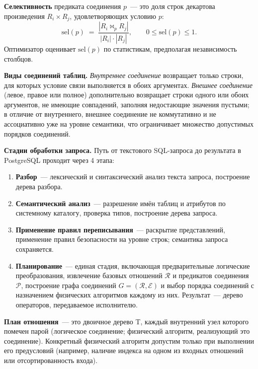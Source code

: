 \textbf{Селективность} предиката соединения $p$~--- это доля строк декартова
произведения $R_i \times R_j$, удовлетворяющих условию $p$:
\[
    \mathrm{sel}(p) \;=\; \frac{|R_i \Join_p R_j|}{|R_i| \cdot |R_j|}, \qquad 0 \leqslant \mathrm{sel}(p) \leqslant 1.
\]
Оптимизатор оценивает $\mathrm{sel}(p)$ по статистикам, предполагая независимость столбцов.


\textbf{Виды соединений таблиц.}
\emph{Внутреннее соединение} возвращает только строки, для которых
условие связи выполняется в обоих аргументах.
\emph{Внешнее соединение} (левое, правое или полное) дополнительно
возвращает строки одного или обоих аргументов, не имеющие совпадений,
заполняя недостающие значения пустыми; в отличие от внутреннего, внешнее соединение
не коммутативно и не ассоциативно уже на уровне семантики, что ограничивает
множество допустимых порядков соединений.

\textbf{Стадии обработки запроса.}
Путь от текстового SQL-запроса до результата в PostgreSQL проходит через
4 этапа:
\begin{enumerate}
    \item \textbf{Разбор}~--- лексический и синтаксический анализ
    текста запроса, построение дерева разбора.
    \item \textbf{Семантический анализ}~--- разрешение имён таблиц
    и атрибутов по системному каталогу, проверка типов, построение
    дерева запроса.
    \item \textbf{Применение правил переписывания}~--- раскрытие
    представлений, применение правил безопасности на уровне строк;
    семантика запроса сохраняется.
    \item \textbf{Планирование}~--- единая стадия, включающая
    предварительные логические преобразования, извлечение базовых отношений
    $\mathcal{R}$ и предикатов соединения $\mathcal{P}$, построение
    графа соединений $G = (\mathcal{R}, \mathcal{E})$ и выбор порядка
    соединений с назначением физических алгоритмов каждому из них.
    Результат~--- дерево операторов, передаваемое исполнителю.
\end{enumerate}


\textbf{План отношения}~---
это двоичное дерево T, каждый внутренний узел которого помечен парой (логическое соединение; физический алгоритм, реализующий это соединение). 
Конкретный физический алгоритм допустим только при выполнении его предусловий (например, наличие индекса на одном из входных 
отношений или отсортированность входа).
\par

